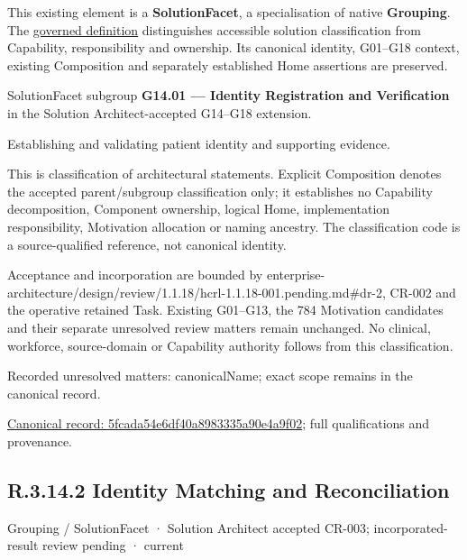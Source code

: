This existing element is a \textbf{SolutionFacet}, a specialisation of native
\textbf{Grouping}. The \href{\detokenize{../../../../../../../governance/continuum-representation.md#solutionfacet-classification--1119-candidate}}{governed definition}
distinguishes accessible solution classification from Capability, responsibility
and ownership. Its canonical identity, G01–G18 context, existing Composition
and separately established Home assertions are preserved.



SolutionFacet subgroup \textbf{G14.01 — Identity Registration and Verification} in the Solution Architect-accepted G14–G18 extension.



Establishing and validating patient identity and supporting evidence.



This is classification of architectural statements. Explicit Composition denotes the accepted parent/subgroup classification only; it establishes no Capability decomposition, Component ownership, logical Home, implementation responsibility, Motivation allocation or naming ancestry. The classification code is a source-qualified reference, not canonical identity.



Acceptance and incorporation are bounded by enterprise-architecture/design/review/1.1.18/hcrl-1.1.18-001.pending.md\#dr-2, CR-002 and the operative retained Task. Existing G01–G13, the 784 Motivation candidates and their separate unresolved review matters remain unchanged. No clinical, workforce, source-domain or Capability authority follows from this classification.


{\small Recorded unresolved matters: canonicalName; exact scope remains in the canonical record.}\par
{\footnotesize \href{../../../../../../../continuum/grouping/5fcada54e6df40a8983335a90e4a9f02.md}{Canonical record: 5fcada54e6df40a8983335a90e4a9f02}; full qualifications and provenance.}\par
\subsection*{R.3.14.2 Identity Matching and Reconciliation}
\label{navigation:R.3.14.2}

\label{element:b91ec2110aaf4d44bd043bb787fbd910}
{\small Grouping / SolutionFacet · Solution Architect accepted CR-003; incorporated-result review pending · current}\par

